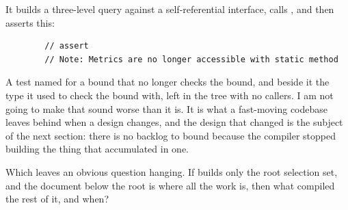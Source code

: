 It builds a three-level query against a self-referential interface, calls
, and then asserts this:

\begin{verbatim}
        // assert
        // Note: Metrics are no longer accessible with static method
\end{verbatim}

A test named for a bound that no longer checks the bound, and beside it the type
it used to check the bound with, left in the tree with no callers. I am not
going to make that sound worse than it is. It is what a fast-moving codebase
leaves behind when a design changes, and the design that changed is the subject
of the next section: there is no backlog to bound because the compiler stopped
building the thing that accumulated in one.

\medskip
Which leaves an obvious question hanging. If  builds only the root
selection set, and the document below the root is where all the work is, then
what compiled the rest of it, and when?

%
